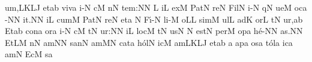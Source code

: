\sgn {}u{m,}\clivis LK\augmentumduplex LJ\egn
\spatium
\divisiominima
\spatium
\sgn {}et\pes ab\egn
\spatium
\sgn viv\punctum a\egn
\sgn {}i-\punctum N\egn
{}c\punctum M\egn
{}n\punctum N\egn
\sgn te{m:}\punctum N\augmentum N\egn
\spatium
\divisiominor
\spatium
\custos L
\lineaproxima
{}i{}\punctum L\egn
\spatium
\sgn {}ex\punctum M\egn
\spatium
\sgn P{a}t\punctum N\egn
\sgn re{}\punctum N\egn
\spatium
\sgn Fil\punctum N\egn
\sgn {}i-\punctum N\egn
{}q\punctum N\egn
\sgn ue{}\punctum M\egn
\spatium
{}oc\punctum a\egn
{}-\punctum N\augmentum N\egn
{}i{t.}\punctum N\augmentum N\egn
\spatium
\divisiofinalis
\spatium
{}i{}\punctum L\egn
\spatium
\sgn cum\punctum M\egn
\spatium
\sgn P{a}t\punctum N\egn
\sgn re{}\punctum N\egn
\spatium
\sgn {}et\punctum a\egn
\spatium
\custos N
\lineaproxima
\sgn F{\'\i}-\punctum N\egn
\sgn li-\punctum M\egn
\sgn {}o{}\punctum L\augmentum L\egn
\spatium
\divisiominima
\spatium
\sgn sim\punctum M\egn
\sgn {}ul\punctum L\egn
\spatium
\sgn {}ad\punctum K\egn
\sgn {}or\punctum L\egn
{}t\punctum N\egn
\sgn {}u{r,}\punctum a\augmentum b\egn
\spatium
\divisiominima
\spatium
\sgn {}Et\pes ab\egn
\spatium
\sgn con\punctum a\egn
{}or\punctum a\egn
\sgn {}i-\punctum N\egn
{}c\punctum M\egn
{}t\punctum N\egn
\sgn {}u{r:}\punctum N\augmentum N\egn
\spatium
\divisiominor
\spatium
{}i{}\punctum L\egn
\spatium
\sgn loc\punctum M\egn
{}t\punctum N\egn
\sgn {}us\punctum N\egn
\spatium
\custos N
\lineaproxima
\sgn {}e{st}\punctum N\egn
\spatium
\sgn per\punctum M\egn
\spatium
{}op\punctum a\egn
\sgn h{\'e}-\punctum N\augmentum N\egn
{}a{s.}\punctum N\augmentum N\egn
\spatium
\divisiofinalis
\spatium
\sgn {}Et\pes LM\egn
\spatium
{}n\punctum N\egn
\sgn {}a{m}\punctum N\augmentum N\egn
\spatium
\sgn s{a}n\punctum N\egn
{}am\punctum M\augmentum N\egn
\spatium
\sgn cat\punctum a\egn
\sgn h{\'o}l\punctum N\egn
\sgn {}ic\punctum M\egn
\sgn {}am\clivis LK\augmentumduplex LJ\egn
\spatium
\divisiominima
\spatium
\sgn {}et\pes ab\egn
\spatium
\custos a
\lineaproxima
\sgn {}ap\punctum a\egn
\sgn {}os\punctum a\egn
\sgn t{\'o}l\punctum a\egn
\sgn {}ic\punctum a\egn
\sgn {}am\punctum N\egn
\spatium
\sgn {}Ec\punctum M\egn
{}s\punctum a\egn
